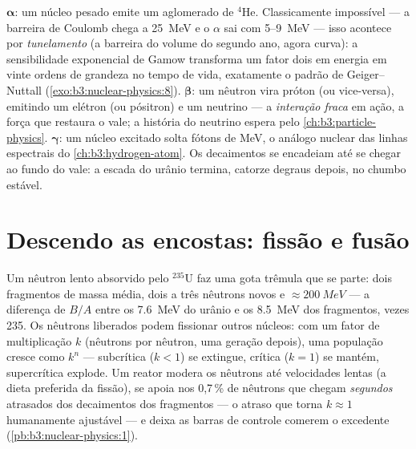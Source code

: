 \begin{remark}\label{rem:b3:nuclear-physics:modes}
$\boldsymbol\alpha$: um núcleo pesado emite um aglomerado de $^4$He.
Classicamente impossível --- a barreira de Coulomb chega a \qty{25}{MeV}
e o $\alpha$ sai com \qty{5}{}--\qty{9}{MeV} --- isso acontece por
\emph{tunelamento} (a barreira do volume do segundo ano, agora curva): a
sensibilidade exponencial de Gamow transforma um fator dois em energia em
vinte ordens de grandeza no tempo de vida, exatamente o padrão de
Geiger--Nuttall (\cref{exo:b3:nuclear-physics:8}).
$\boldsymbol\beta$: um nêutron vira próton (ou vice-versa), emitindo
um elétron (ou pósitron) e um neutrino --- a \emph{interação
fraca} em ação, a força que restaura o vale; a história do neutrino
espera pelo \cref{ch:b3:particle-physics}.
$\boldsymbol\gamma$: um núcleo excitado solta fótons de \unit{MeV}, o
análogo nuclear das linhas espectrais do \cref{ch:b3:hydrogen-atom}.
Os decaimentos se encadeiam até se chegar ao fundo do vale: a escada do
urânio termina, catorze degraus depois, no chumbo estável.
\end{remark}

\section{Descendo as encostas: fissão e fusão}

\begin{proposition}\label{prop:b3:nuclear-physics:fission}
Um nêutron lento absorvido pelo $^{235}$U faz uma gota trêmula que
se parte: dois fragmentos de massa média, dois a três nêutrons novos e
$\approx\qty{200}{MeV}$ --- a diferença de $B/A$ entre os
\qty{7.6}{MeV} do urânio e os \qty{8.5}{MeV} dos fragmentos, vezes 235.
Os nêutrons liberados podem fissionar outros núcleos: com um fator de
multiplicação $k$ (nêutrons por nêutron, uma geração
depois), uma população cresce como $k^n$ --- subcrítica ($k < 1$)
se extingue, crítica ($k = 1$) se mantém, supercrítica explode.
Um reator modera os nêutrons até velocidades lentas (a dieta preferida
da fissão), se apoia nos 0,7\,\% de nêutrons que chegam
\emph{segundos} atrasados dos decaimentos dos fragmentos --- o atraso que
torna $k \approx 1$ humanamente ajustável --- e deixa as barras de
controle comerem o excedente (\cref{pb:b3:nuclear-physics:1}).
\end{proposition}
\admitted

